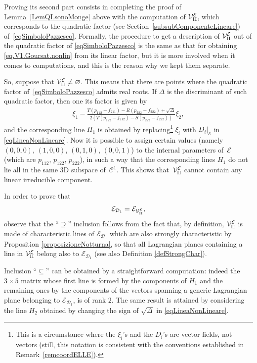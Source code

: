 \documentclass[pdftex]{sigma}
\newcommand{\C}{\mathcal{C}}
\newcommand{\D}{\mathcal{D}}
\newcommand{\MMM}{\mathcal{V}_{\textrm{\normalfont II}}}
\newcommand{\E}{\mathcal{E}}
\newcommand{\elle}{H}
\numberwithin{equation}{section}
\begin{document}
Proving its second part consists in completing the proof of Lemma~\ref{LemQLsonoMonge} above with the computation of $\MMM^\E$, which corresponds to the quadratic factor (see Section~\ref{subsubComponenteLineare}) of~\eqref{eqSimboloPazzesco}. Formally, the procedure to get a description of $\MMM^\E$ out of the quadratic factor of \eqref{eqSimboloPazzesco} is the same as that for obtaining \eqref{eq.V1.Goursat.nonlin} from its linear factor, but it is more involved when it comes to computations, and this is the reason why we kept them separate.

So, suppose that $\MMM^\E\neq\varnothing$. This means that there are points where the quadratic factor of~\eqref{eqSimboloPazzesco} admits real roots.
If $\Delta$ is the discriminant of such quadratic factor, then one its factor is given by
\begin{gather}\label{eqLineaNonLineare}
\xi_1-\frac{T(p_{112}-f_{211})-R(p_{222}-f_{222})+\sqrt{\Delta}}{2(T(p_{122}-f_{212})-S(p_{222}-f_{222}))}\xi_2,
\end{gather}
and the corresponding line $\elle_1$ is obtained by replacing\footnote{This is a circumstance where the $\xi_i$'s and the $D_i$'s are vector f\/ields, not vectors (still, this notation is consistent with the conventions established in Remark~\ref{remcoordELLE}).} $\xi_i$ with $D_i|_\E$ in \eqref{eqLineaNonLineare}.
Now it is possible to assign certain values (namely $(0,0,0)$, $(1,0,0)$, $(0,1,0)$, $(0,0,1)$) to the internal parameters of~$\E$ (which are $p_{112}$, $p_{122}$, $p_{222}$), in such a way that the corresponding lines $\elle_1$ do not lie all in the same 3D subspace of~$\C^1$.
This shows that~$\MMM^\E$ cannot contain any linear irreducible component.

In order to prove that
\begin{gather*}
\E_{\D_1}=\E_{\MMM^\E},
\end{gather*}
observe that the ``$\supseteq$'' inclusion follows from the fact that, by def\/inition, $\MMM^\E$ is made of characte\-ris\-tic lines of $\E_{\D_1}$ which are also strongly characteristic by Proposition \ref{proposizioneNotturna}, so that all Lagrangian planes containing a line in $\MMM^\E$ belong also to $\E_{\D_1}$ (see also Def\/inition \ref{defStrongChar}).

Inclusion ``$\subseteq$'' can be obtained by a straightforward computation: indeed the $3\times 5$ matrix whose f\/irst line is formed by the components of $\elle_1$ and the remaining ones by the components of the vectors spanning a generic Lagrangian plane belonging to $\E_{\D_1}$, is of rank $2$. The same result is attained by considering the line $\elle_2$ obtained by changing the sign of $\sqrt{\Delta}$ in \eqref{eqLineaNonLineare}.
\end{document}
